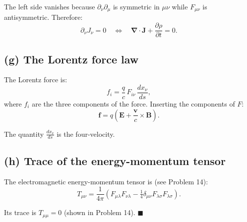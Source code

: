 \documentclass[12pt]{article}
\newcommand{\vect}[1]{\mathbf{#1}}
\newcommand{\grad}{\boldsymbol{\nabla}}
\begin{document}
The left side vanishes because $\partial_\nu\partial_\mu$ is symmetric in $\mu\nu$ while $F_{\mu\nu}$ is antisymmetric. Therefore:
\[
\partial_\nu J_\nu = 0 \quad \Longleftrightarrow \quad \grad\cdot\vect{J} + \frac{\partial\rho}{\partial t} = 0.
\]

\subsection*{(g) The Lorentz force law}

The Lorentz force is:
\[
f_i = \frac{q}{c}\,F_{i\nu}\,\frac{dx_\nu}{ds},
\]
where $f_i$ are the three components of the force. Inserting the components of $F$:
\[
\vect{f} = q\!\left(\vect{E} + \frac{\vect{v}}{c}\times\vect{B}\right).
\]

The quantity $\frac{dx_\nu}{ds}$ is the four-velocity.

\subsection*{(h) Trace of the energy-momentum tensor}

The electromagnetic energy-momentum tensor is (see Problem 14):
\[
T_{\mu\nu} = \frac{1}{4\pi}\!\left(F_{\mu\lambda}F_{\nu\lambda} - \tfrac{1}{4}\delta_{\mu\nu}F_{\lambda\sigma}F_{\lambda\sigma}\right).
\]

Its trace is $T_{\mu\mu} = 0$ (shown in Problem 14). \hfill $\blacksquare$
\end{document}
